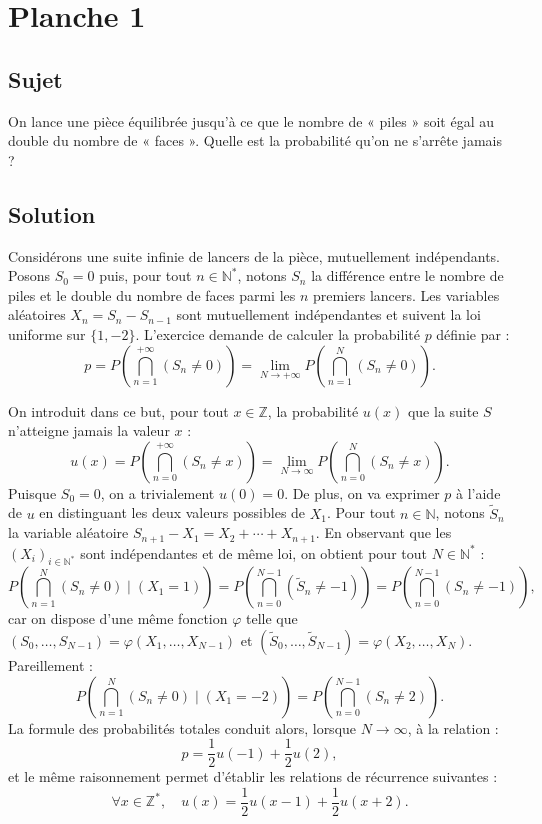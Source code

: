 \chapter{Planche 1}

\section{Sujet}

On lance une pièce équilibrée jusqu'à ce que le nombre de « piles » soit égal au double du nombre de « faces ». Quelle est la probabilité qu'on ne s'arrête jamais ?

\section{Solution}


Considérons une suite infinie de lancers de la pièce, mutuellement indépendants. Posons $S_0 = 0$ puis, pour tout $n \in \mathbb N^*$, notons $S_n$ la différence entre le nombre de piles et le double du nombre de faces parmi les $n$ premiers lancers. Les variables aléatoires $X_n = S_n - S_{n-1}$ sont mutuellement indépendantes et suivent la loi uniforme sur $\{1,-2\}$. L'exercice demande de calculer la probabilité $p$ définie par :
\[
p = P\left(\bigcap_{n=1}^{+\infty} (S_n \neq 0)\right) = \lim_{N\to+\infty} P\left(\bigcap_{n=1}^N (S_n \neq 0)\right).
\]

On introduit dans ce but, pour tout $x \in \mathbb Z$, la probabilité $u(x)$ que la suite $S$ n'atteigne jamais la valeur $x$ :
\[
u(x) = P\left(\bigcap_{n=0}^{+\infty} (S_n \neq x)\right) = \lim_{N\to\infty} P\left(\bigcap_{n=0}^N (S_n \neq x)\right).
\]
Puisque $S_0=0$, on a trivialement $u(0) = 0$. De plus, on va exprimer $p$ à l'aide de $u$ en distinguant les deux valeurs possibles de $X_1$. Pour tout $n \in \mathbb N$, notons $\tilde S_n$ la variable aléatoire $S_{n+1} - X_1 = X_2 + \cdots + X_{n+1}$. En observant que les $(X_i)_{i\in\mathbb N^*}$ sont indépendantes et de même loi, on obtient pour tout $N \in \mathbb N^*$ :
\[
P\left(\bigcap_{n=1}^N (S_n \neq 0)\mid (X_1 = 1)\right) = P\left(\bigcap_{n=0}^{N-1} (\tilde S_n \neq -1)\right) = P\left(\bigcap_{n=0}^{N-1} (S_n \neq -1)\right),
\]
car on dispose d'une même fonction $\varphi$ telle que $(S_0,\dots,S_{N-1}) = \varphi(X_1,\dots,X_{N-1})$ et $(\tilde S_0,\dots,\tilde S_{N-1}) = \varphi(X_2,\dots,X_N)$. 
Pareillement :
\[
P\left(\bigcap_{n=1}^N (S_n \neq 0)\mid (X_1 = -2)\right) = P\left(\bigcap_{n=0}^{N-1} (S_n \neq 2)\right).
\]
La formule des probabilités totales conduit alors, lorsque $N \to \infty$, à la relation :
\[
p= \frac12 u(-1) + \frac12 u(2),
\]
et le même raisonnement permet d'établir les relations de récurrence suivantes :
\[
\forall x \in \mathbb Z^*,\quad
u(x) = \frac12 u(x-1) + \frac12 u(x+2).
\]

